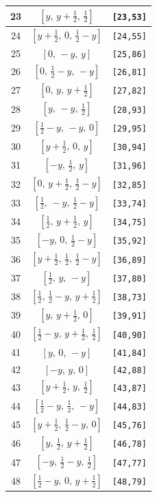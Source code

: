 \documentclass[fleqn,8pt]{jsarticle}
\begin{document}
\begin{longtable}{ccc}
23 & $\left[ y,\, y + \frac{1}{2},\, \frac{1}{2} \right]$ & {\tt [23,53]} \\ \hline
24 & $\left[ y + \frac{1}{2},\, 0,\, \frac{1}{2} - y \right]$ & {\tt [24,55]} \\ \hline
25 & $\left[ 0,\, - y,\, y \right]$ & {\tt [25,86]} \\ \hline
26 & $\left[ 0,\, \frac{1}{2} - y,\, - y \right]$ & {\tt [26,81]} \\ \hline
27 & $\left[ 0,\, y,\, y + \frac{1}{2} \right]$ & {\tt [27,82]} \\ \hline
28 & $\left[ y,\, - y,\, \frac{1}{2} \right]$ & {\tt [28,93]} \\ \hline
29 & $\left[ \frac{1}{2} - y,\, - y,\, 0 \right]$ & {\tt [29,95]} \\ \hline
30 & $\left[ y + \frac{1}{2},\, 0,\, y \right]$ & {\tt [30,94]} \\ \hline
31 & $\left[ - y,\, \frac{1}{2},\, y \right]$ & {\tt [31,96]} \\ \hline
32 & $\left[ 0,\, y + \frac{1}{2},\, \frac{1}{2} - y \right]$ & {\tt [32,85]} \\ \hline
33 & $\left[ \frac{1}{2},\, - y,\, \frac{1}{2} - y \right]$ & {\tt [33,74]} \\ \hline
34 & $\left[ \frac{1}{2},\, y + \frac{1}{2},\, y \right]$ & {\tt [34,75]} \\ \hline
35 & $\left[ - y,\, 0,\, \frac{1}{2} - y \right]$ & {\tt [35,92]} \\ \hline
36 & $\left[ y + \frac{1}{2},\, \frac{1}{2},\, \frac{1}{2} - y \right]$ & {\tt [36,89]} \\ \hline
37 & $\left[ \frac{1}{2},\, y,\, - y \right]$ & {\tt [37,80]} \\ \hline
38 & $\left[ \frac{1}{2},\, \frac{1}{2} - y,\, y + \frac{1}{2} \right]$ & {\tt [38,73]} \\ \hline
39 & $\left[ y,\, y + \frac{1}{2},\, 0 \right]$ & {\tt [39,91]} \\ \hline
40 & $\left[ \frac{1}{2} - y,\, y + \frac{1}{2},\, \frac{1}{2} \right]$ & {\tt [40,90]} \\ \hline
41 & $\left[ y,\, 0,\, - y \right]$ & {\tt [41,84]} \\ \hline
42 & $\left[ - y,\, y,\, 0 \right]$ & {\tt [42,88]} \\ \hline
43 & $\left[ y + \frac{1}{2},\, y,\, \frac{1}{2} \right]$ & {\tt [43,87]} \\ \hline
44 & $\left[ \frac{1}{2} - y,\, \frac{1}{2},\, - y \right]$ & {\tt [44,83]} \\ \hline
45 & $\left[ y + \frac{1}{2},\, \frac{1}{2} - y,\, 0 \right]$ & {\tt [45,76]} \\ \hline
46 & $\left[ y,\, \frac{1}{2},\, y + \frac{1}{2} \right]$ & {\tt [46,78]} \\ \hline
47 & $\left[ - y,\, \frac{1}{2} - y,\, \frac{1}{2} \right]$ & {\tt [47,77]} \\ \hline
48 & $\left[ \frac{1}{2} - y,\, 0,\, y + \frac{1}{2} \right]$ & {\tt [48,79]} \\
\end{longtable}
\end{document}
